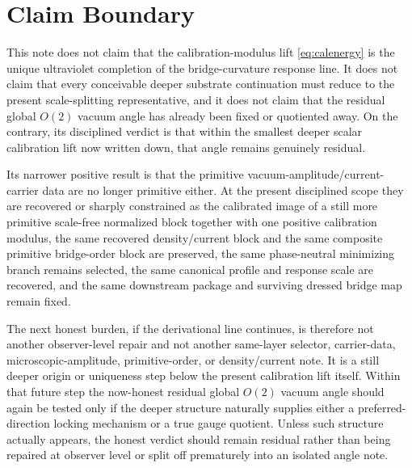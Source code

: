 \documentclass[11pt]{article}
\begin{document}
\section{Claim Boundary}

This note does not claim that the calibration-modulus lift \eqref{eq:calenergy} is the unique ultraviolet completion of the bridge-curvature response line. It does not claim that every conceivable deeper substrate continuation must reduce to the present scale-splitting representative, and it does not claim that the residual global \(O(2)\) vacuum angle has already been fixed or quotiented away. On the contrary, its disciplined verdict is that within the smallest deeper scalar calibration lift now written down, that angle remains genuinely residual.

Its narrower positive result is that the primitive vacuum-amplitude/current-carrier data are no longer primitive either. At the present disciplined scope they are recovered or sharply constrained as the calibrated image of a still more primitive scale-free normalized block together with one positive calibration modulus, the same recovered density/current block and the same composite primitive bridge-order block are preserved, the same phase-neutral minimizing branch remains selected, the same canonical profile and response scale are recovered, and the same downstream package and surviving dressed bridge map remain fixed.

The next honest burden, if the derivational line continues, is therefore not another observer-level repair and not another same-layer selector, carrier-data, microscopic-amplitude, primitive-order, or density/current note. It is a still deeper origin or uniqueness step below the present calibration lift itself. Within that future step the now-honest residual global \(O(2)\) vacuum angle should again be tested only if the deeper structure naturally supplies either a preferred-direction locking mechanism or a true gauge quotient. Unless such structure actually appears, the honest verdict should remain residual rather than being repaired at observer level or split off prematurely into an isolated angle note.
\end{document}
